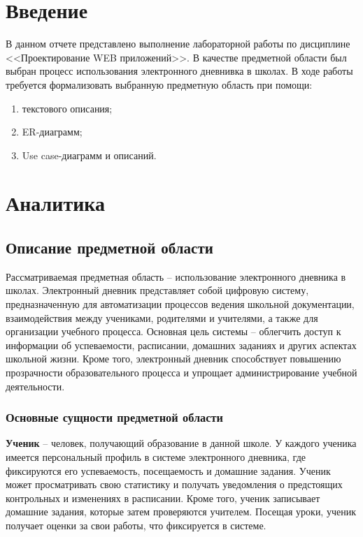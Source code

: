 \documentclass[a4paper, final]{article}
\begin{document}
\newpage

\tableofcontents

\newpage

\cleardoublepage
{}

\section*{Введение}
В данном отчете представлено выполнение лабораторной работы по дисциплине <<Проектирование WEB приложений>>. В качестве предметной области был выбран процесс использования электронного дневнивка в школах.
В ходе работы требуется формализовать выбранную предметную область при помощи:
\begin{enumerate}
    \item текстового описания;
    \item ER-диаграмм;
    \item Use case-диаграмм и описаний.
\end{enumerate}

\newpage
\section{Аналитика}
\subsection{Описание предметной области}

Рассматриваемая предметная область -- использование электронного дневника в школах. Электронный дневник представляет собой цифровую систему, предназначенную для автоматизации процессов ведения школьной документации, взаимодействия между учениками, родителями и учителями, а также для организации учебного процесса. Основная цель системы -- облегчить доступ к информации об успеваемости, расписании, домашних заданиях и других аспектах школьной жизни. Кроме того, электронный дневник способствует повышению прозрачности образовательного процесса и упрощает администрирование учебной деятельности.

\subsubsection{Основные сущности предметной области}

\textbf{Ученик} -- человек, получающий образование в данной школе. У каждого ученика имеется персональный профиль в системе электронного дневника, где фиксируются его успеваемость, посещаемость и домашние задания. Ученик может просматривать свою статистику и получать уведомления о предстоящих контрольных и изменениях в расписании. Кроме того, ученик записывает домашние задания, которые затем проверяются учителем. Посещая уроки, ученик получает оценки за свои работы, что фиксируется в системе.
\end{document}
